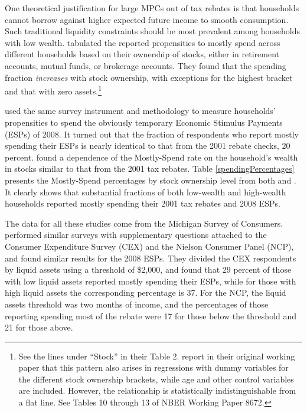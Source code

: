 \documentclass[fleqccn,12pt]{article}
\begin{document}
One theoretical justification for large MPCs out of tax rebates is that households cannot borrow against higher expected future income to smooth consumption. Such traditional liquidity constraints should be most prevalent among households with low wealth. \citeauthor{aer2003ShapiroSlemrod} tabulated the reported propensities to mostly spend across different households based on their ownership of stocks, either in retirement accounts, mutual funds, or brokerage accounts. They found that the spending fraction \emph{increases} with stock ownership, with exceptions for the highest bracket and that with zero assets.\footnote{See the lines under ``Stock'' in their Table 2.  \citeauthor*{aer2003ShapiroSlemrod} report in their original working paper that this pattern also arises in regressions with dummy variables for the different stock ownership brackets, while age and other control variables are included. However, the relationship is statistically indistinguishable from a flat line. See Tables 10 through 13 of NBER Working Paper 8672.}

\cite{aer2009ShapiroSlemrod} used the same survey instrument and methodology to measure households' propensities to spend the obviously temporary Economic Stimulus Payments (ESPs) of 2008. It turned out that the fraction of respondents who report mostly spending their ESPs is nearly identical to that from the 2001 rebate checks, $20$ percent. \citet*{taxPolicy2010SahmShapiroSlemrod} found a dependence of the Mostly-Spend rate on the household's wealth in stocks similar to that from the 2001 tax rebates. Table \ref{spendingPercentages} presents the Mostly-Spend percentages by stock ownership level from both \cite{aer2003ShapiroSlemrod} and \citet*{taxPolicy2010SahmShapiroSlemrod}. 
It clearly shows that substantial fractions of both low-wealth and high-wealth households reported mostly spending their 2001 tax rebates and 2008 ESPs.

The data for all these studies come from the Michigan Survey of Consumers. \cite{nber2017ParkerSouleles} performed similar surveys with supplementary questions attached to the Consumer Expenditure Survey (CEX) and the Nielson Consumer Panel (NCP), and found similar results for the 2008 ESPs. They divided the CEX respondents by liquid assets using a threshold of \$2,000, and found that 29 percent of those with low liquid assets reported mostly spending their ESPs, while for those with high liquid assets the corresponding percentage is 37. For the NCP, the liquid assets threshold was two months of income, and the percentages of those reporting spending most of the rebate were 17 for those below the threshold and 21 for those above. 
\end{document}
